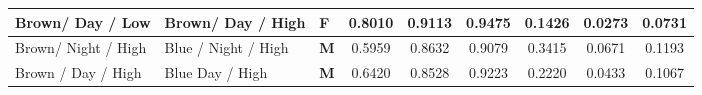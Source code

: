 \documentclass[runningheads]{llncs}
\begin{document}
\begin{table}[t]
{\begin{tabular}{|l|l|l|c|c|c|c|c|c|}
Brown/ Day / Low                              & Brown/ Day / High                     & \textbf{F}    & 0.8010      & 0.9113      & 0.9475      & 0.1426       & 0.0273       & 0.0731         \\ \hline
Brown/ Night / High                           & Blue / Night / High     & \textbf{M}    & 0.5959      & 0.8632      & 0.9079      & 0.3415       & 0.0671       & 0.1193         \\ \hline
Brown / Day / High                             & Blue Day / High       & \textbf{M}    & 0.6420      & 0.8528      & 0.9223      & 0.2220       & 0.0433       & 0.1067         \\ \hline
\end{tabular}}
\vspace{-1.5em}
\end{table}
\end{document}

